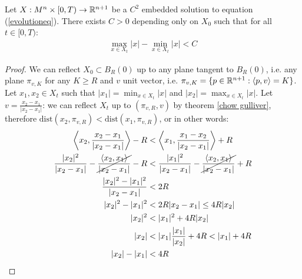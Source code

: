\begin{cor}
	Let $X:M^n\times [0,T) \rightarrow \mathbb{R}^{n+1}$ be a $C^2$ embedded solution to equation (\ref{evolutioneq}). There exists $C>0$ depending only on $X_0$ such that for all $t\in[0, T)$: 
	\begin{align*}
		\max_{x\in X_t} |x| - \min_{x\in X_t} |x| < C
	\end{align*}
\end{cor}
\begin{proof}
	We can reflect $X_0\subset B_R(0)$ up to any plane tangent to  $B_R(0)$, i.e. any plane $\pi_{v, K}$ for any $K\geq R$ and $v$ unit vector, i.e.  $\pi_{v, K}=\{p \in \mathbb{R}^{n+1} : \langle p, v \rangle = K\}$. Let $x_1, x_2\in X_t$ such that $|x_1|=\min_{x\in X_t} |x|$ and  $|x_2|=\max_{x\in X_t} |x|$. Let $v=\frac{x_2-x_1}{\vert x_2-x_1 \vert}$: we can reflect $X_t$ up to $(\pi_{v, R}, v)$ by theorem \ref{chow gulliver}, therefore $\mathrm{dist}(x_2, \pi_{v, R}) < \mathrm{dist}(x_1, \pi_{v, R})$, or in other words:
	\begin{align*}
		 \left\langle x_2, \frac{x_2-x_1}{\vert x_2-x_1 \vert} \right\rangle - R &< 
		 \left\langle x_1, \frac{x_1-x_2}{\vert x_2-x_1 \vert} \right\rangle + R\\
		 \frac{|x_2|^2}{\vert x_2-x_1 \vert} - \cancel{\frac{\left\langle x_2, x_1\right\rangle}{\vert x_2-x_1 \vert}}  - R &< 
		 \frac{\vert x_1\vert^2}{\vert x_2-x_1 \vert} - \cancel{\frac{\left\langle x_2, x_1\right\rangle}{\vert x_2-x_1 \vert}}  + R\\
		 \frac{|x_2|^2 - |x_1|^2}{\vert x_2-x_1 \vert} &< 
		  2R\\
		  |x_2|^2 - |x_1|^2 &< 
		  2R \vert x_2-x_1 \vert \leq 4R |x_2|\\
		  |x_2|^2 &<|x_1|^2 + 4R |x_2|\\
		  |x_2| &< |x_1| \frac{|x_1|}{|x_2|} + 4R < |x_1| + 4R\\
		  |x_2| -|x_1| &<4R
	\end{align*}
\end{proof}


